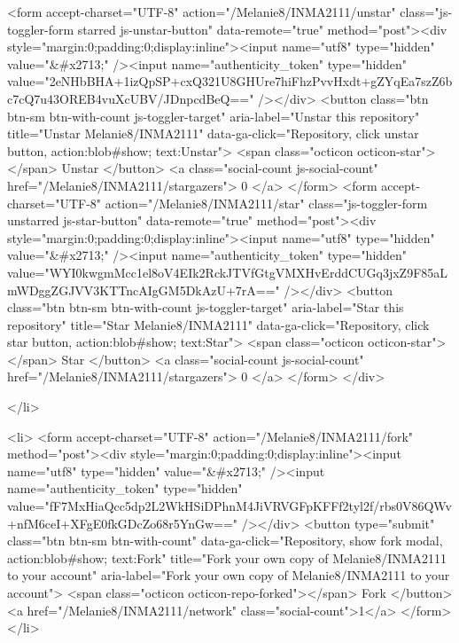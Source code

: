     <form accept-charset="UTF-8" action="/Melanie8/INMA2111/unstar" class="js-toggler-form starred js-unstar-button" data-remote="true" method="post"><div style="margin:0;padding:0;display:inline"><input name="utf8" type="hidden" value="&#x2713;" /><input name="authenticity_token" type="hidden" value="2eNHbBHA+1izQpSP+cxQ321U8GHUre7hiFhzPvvHxdt+gZYqEa7szZ6bc7cQ7u43OREB4vuXcUBV/JDnpcdBeQ==" /></div>
      <button
        class="btn btn-sm btn-with-count js-toggler-target"
        aria-label="Unstar this repository" title="Unstar Melanie8/INMA2111"
        data-ga-click="Repository, click unstar button, action:blob#show; text:Unstar">
        <span class="octicon octicon-star"></span>
        Unstar
      </button>
        <a class="social-count js-social-count" href="/Melanie8/INMA2111/stargazers">
          0
        </a>
</form>
    <form accept-charset="UTF-8" action="/Melanie8/INMA2111/star" class="js-toggler-form unstarred js-star-button" data-remote="true" method="post"><div style="margin:0;padding:0;display:inline"><input name="utf8" type="hidden" value="&#x2713;" /><input name="authenticity_token" type="hidden" value="WYI0kwgmMcc1el8oV4EIk2RckJTVfGtgVMXHvErddCUGq3jxZ9F85aLmWDggZGJVV3KTTncAIgGM5DkAzU+7rA==" /></div>
      <button
        class="btn btn-sm btn-with-count js-toggler-target"
        aria-label="Star this repository" title="Star Melanie8/INMA2111"
        data-ga-click="Repository, click star button, action:blob#show; text:Star">
        <span class="octicon octicon-star"></span>
        Star
      </button>
        <a class="social-count js-social-count" href="/Melanie8/INMA2111/stargazers">
          0
        </a>
</form>  </div>

  </li>

        <li>
          <form accept-charset="UTF-8" action="/Melanie8/INMA2111/fork" method="post"><div style="margin:0;padding:0;display:inline"><input name="utf8" type="hidden" value="&#x2713;" /><input name="authenticity_token" type="hidden" value="fF7MxHiaQcc5dp2L2WkHSiDPhnM4JiVRVGFpKFFf2tyl2f/rbs0V86QWv+nfM6ceI+XFgE0fkGDcZo68r5YnGw==" /></div>
            <button
                type="submit"
                class="btn btn-sm btn-with-count"
                data-ga-click="Repository, show fork modal, action:blob#show; text:Fork"
                title="Fork your own copy of Melanie8/INMA2111 to your account"
                aria-label="Fork your own copy of Melanie8/INMA2111 to your account">
              <span class="octicon octicon-repo-forked"></span>
              Fork
            </button>
            <a href="/Melanie8/INMA2111/network" class="social-count">1</a>
</form>        </li>

